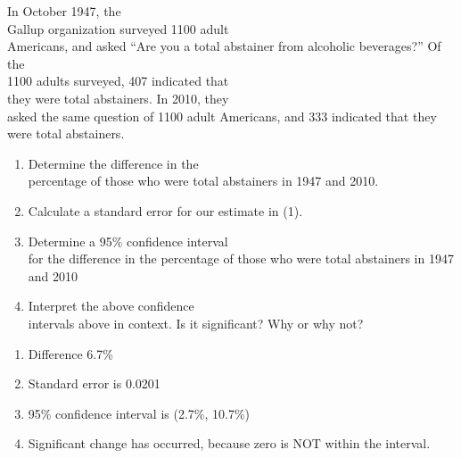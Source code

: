 \documentclass[11pt]{book}\usepackage[]{graphicx}\usepackage[]{color}
\begin{document}
\begin{exercises}
\begin{exercise} %
  
In October 1947, the \\ Gallup organization surveyed 1100 adult \\ Americans, and asked ``Are you a total abstainer from alcoholic beverages?''  Of the \\ 1100 adults surveyed, 407 indicated that \\ they were total abstainers.  In 2010, they  \\ asked the same question of 1100 adult Americans, and 333 indicated that they were total abstainers.  
  
\begin{enumerate}
\item Determine the difference in the \\ percentage of those who were total abstainers in 1947 and 2010.

\item Calculate a standard error for our estimate in (1).

\item Determine a 95\% confidence interval \\ for the difference in the percentage of those who were total abstainers in 1947 and 2010

\item Interpret the above confidence \\ intervals above in context.  Is it significant? Why or why not?

\end{enumerate}

\end{exercise}
\begin{solution}    %

\begin{enumerate}
\item Difference 6.7\% 

\item Standard error is 0.0201
\item  95\% confidence interval is (2.7\%, 10.7\%)

\item Significant change has occurred, because zero is NOT within the interval.

\end{enumerate}

\end{solution}

\begin{exercise}   %


\end{exercise}
\end{exercises}
\end{document}
